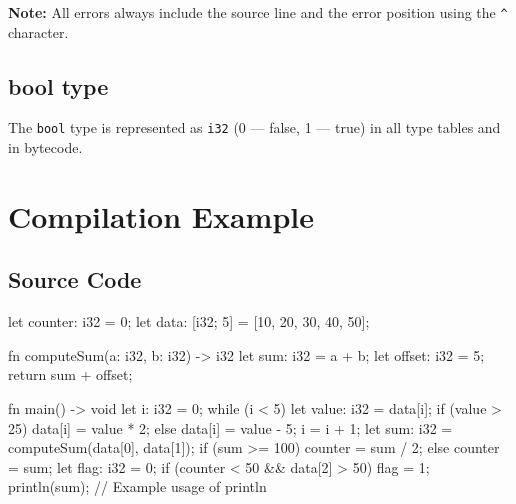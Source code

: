 \documentclass[a4paper,12pt]{article}
\begin{document}
\textbf{Note:} All errors always include the source line and the error position using the \texttt{^} character.

\subsection*{bool type}
  The \texttt{bool} type is represented as \texttt{i32} (0 --- false, 1 --- true) in all type tables and in bytecode.

\section{Compilation Example}
\subsection{Source Code}
\begin{snailcode}
  let counter: i32 = 0;
  let data: [i32; 5] = [10, 20, 30, 40, 50];

  fn computeSum(a: i32, b: i32) -> i32 {
  let sum: i32 = a + b;
  let offset: i32 = 5;
  return sum + offset;
  }

  fn main() -> void {
  let i: i32 = 0;
  while (i < 5) {
  let value: i32 = data[i];
  if (value > 25) {
  data[i] = value * 2;
  } else {
  data[i] = value - 5;
  }
  i = i + 1;
  }
  let sum: i32 = computeSum(data[0], data[1]);
  if (sum >= 100) {
  counter = sum / 2;
  } else {
  counter = sum;
  }
  let flag: i32 = 0;
  if (counter < 50 && data[2] > 50) {
  flag = 1;
  }
  println(sum); // Example usage of println
  }
\end{snailcode}
\end{document}
